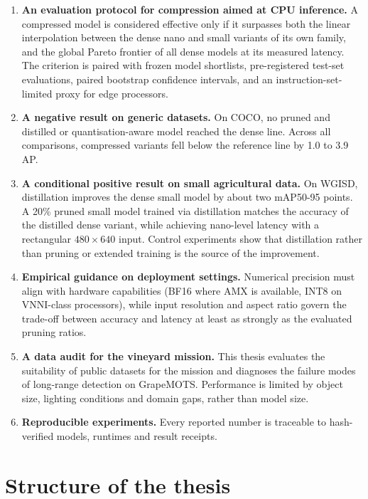 \documentclass[a4paper,11pt,twoside]{report}
\theoremstyle{definition}
\begin{document}
\begin{enumerate}
    \item \textbf{An evaluation protocol for compression aimed at CPU inference.} A compressed model is considered effective only if it surpasses both the linear interpolation between the dense nano and small variants of its own family, and the global Pareto frontier of all dense models at its measured latency. The criterion is paired with frozen model shortlists, pre-registered test-set evaluations, paired bootstrap confidence intervals, and an instruction-set-limited proxy for edge processors.
    \item \textbf{A negative result on generic datasets.} On COCO, no pruned and distilled or quantisation-aware model reached the dense line. Across all comparisons, compressed variants fell below the reference line by 1.0 to 3.9 AP. 
    \item \textbf{A conditional positive result on small agricultural data.} On WGISD, distillation improves the dense small model by about two mAP50-95 points. A 20\% pruned small model trained via distillation matches the accuracy of the distilled dense variant, while achieving nano-level latency with a rectangular $480\times640$ input. Control experiments show that distillation rather than pruning or extended training is the source of the improvement.
    \item \textbf{Empirical guidance on deployment settings.} Numerical precision must align with hardware capabilities (BF16 where AMX is available, INT8 on VNNI-class processors), while input resolution and aspect ratio govern the trade-off between accuracy and latency at least as strongly as the evaluated pruning ratios. 
    \item \textbf{A data audit for the vineyard mission.} This thesis evaluates the suitability of public datasets for the mission and diagnoses the failure modes of long-range detection on GrapeMOTS. Performance is limited by object size, lighting conditions and domain gaps, rather than model size.
    \item \textbf{Reproducible experiments.} Every reported number is traceable to hash-verified models, runtimes and result receipts.
\end{enumerate}

\section{Structure of the thesis}
\label{sec:intro_structure}
\end{document}
